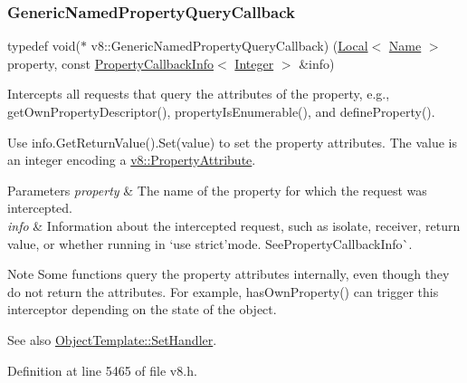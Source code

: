 \mbox{\label{namespacev8_add9f7ab11e4a9a2b9ad2c4536b0e1a64}} 
\subsubsection{\texorpdfstring{Generic\+Named\+Property\+Query\+Callback}{GenericNamedPropertyQueryCallback}}
{\footnotesize\ttfamily typedef void($\ast$ v8\+::\+Generic\+Named\+Property\+Query\+Callback) (\mbox{\hyperlink{classv8_1_1Local}{Local}}$<$ \mbox{\hyperlink{classv8_1_1Name}{Name}} $>$ property, const \mbox{\hyperlink{classv8_1_1PropertyCallbackInfo}{Property\+Callback\+Info}}$<$ \mbox{\hyperlink{classv8_1_1Integer}{Integer}} $>$ \&info)}

Intercepts all requests that query the attributes of the property, e.\+g., get\+Own\+Property\+Descriptor(), property\+Is\+Enumerable(), and define\+Property().

Use {\ttfamily info.\+Get\+Return\+Value().Set(value)} to set the property attributes. The value is an integer encoding a {\ttfamily \mbox{\hyperlink{namespacev8_a05f25f935e108a1ea2d150e274602b87}{v8\+::\+Property\+Attribute}}}.


\begin{DoxyParams}{Parameters}
{\em property} & The name of the property for which the request was intercepted. \\
\hline
{\em info} & Information about the intercepted request, such as isolate, receiver, return value, or whether running in `\textquotesingle{}use strict'{\ttfamily mode. See}Property\+Callback\+Info\`{}.\\
\hline
\end{DoxyParams}
\begin{DoxyNote}{Note}
Some functions query the property attributes internally, even though they do not return the attributes. For example, {\ttfamily has\+Own\+Property()} can trigger this interceptor depending on the state of the object.
\end{DoxyNote}
See also {\ttfamily \mbox{\hyperlink{classv8_1_1ObjectTemplate_a3d5666f1e9b0f46df6b4dbb7cfbb6114}{Object\+Template\+::\+Set\+Handler}}.} 

Definition at line 5465 of file v8.\+h.

\mbox{\label{namespacev8_af74716c6e95a269c6cd4314662fd0a7e}} 
